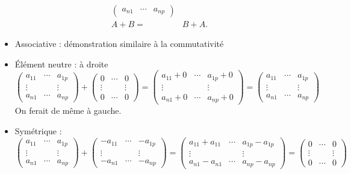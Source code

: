 \documentclass{book}
\begin{document}
\begin{Demonstration}
\begin{itemize}
$$\begin{aligned}
\begin{pmatrix}
a_{n1} & \cdots & a_{np}
\end{pmatrix}\\
A+B=&B+A.
\end{aligned}$$
\item Associative : démonstration similaire à la commutativité
\item Élément neutre : à droite
$$\begin{pmatrix}
a_{11} & \cdots & a_{1p}\\
 \vdots &  & \vdots\\
a_{n1} & \cdots & a_{np}
\end{pmatrix}+\begin{pmatrix}
0 & \cdots & 0\\
 \vdots &  & \vdots\\
0 & \cdots & 0
\end{pmatrix}=\begin{pmatrix}
a_{11}+0 & \cdots & a_{1p}+0\\
 \vdots &  & \vdots\\
a_{n1}+0 & \cdots & a_{np}+0
\end{pmatrix}=\begin{pmatrix}
a_{11} & \cdots & a_{1p}\\
 \vdots &  & \vdots\\
a_{n1} & \cdots & a_{np}
\end{pmatrix}
$$
On ferait de même à gauche. 
\item Symétrique :
$$\begin{pmatrix}
a_{11} & \cdots & a_{1p}\\
 \vdots &  & \vdots\\
a_{n1} & \cdots & a_{np}
\end{pmatrix}+\begin{pmatrix}
-a_{11} & \cdots & -a_{1p}\\
 \vdots &  & \vdots\\
-a_{n1} & \cdots & -a_{np}
\end{pmatrix}=\begin{pmatrix}
a_{11}+a_{11} & \cdots & a_{1p}-a_{1p}\\
 \vdots &  & \vdots\\
a_{n1}-a_{n1}& \cdots & a_{np}-a_{np}
\end{pmatrix}=\begin{pmatrix}
0 & \cdots & 0\\
 \vdots &  & \vdots\\
0 & \cdots & 0
\end{pmatrix}
$$
\end{itemize}
\end{Demonstration}
\end{document}
